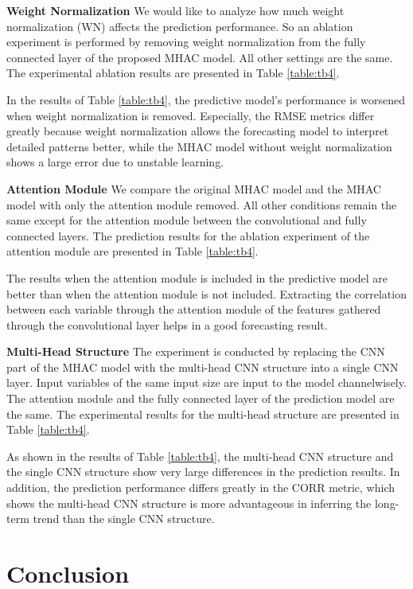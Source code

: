 \documentclass[conference]{IEEEtran}
\begin{document}
\noindent \textbf{Weight Normalization} We would like to analyze how much weight normalization (WN) affects the prediction performance. So an ablation experiment is performed by removing weight normalization from the fully connected layer of the proposed MHAC model. All other settings are the same. The experimental ablation results are presented in Table \ref{table:tb4}.

In the results of Table \ref{table:tb4}, the predictive model's performance is worsened when weight normalization is removed. Especially, the RMSE metrics differ greatly because weight normalization allows the forecasting model to interpret detailed patterns better, while the MHAC model without weight normalization shows a large error due to unstable learning.

\noindent \textbf{Attention Module} We compare the original MHAC model and the MHAC model with only the attention module removed. All other conditions remain the same except for the attention module between the convolutional and fully connected layers. The prediction results for the ablation experiment of the attention module are presented in Table \ref{table:tb4}.

The results when the attention module is included in the predictive model are better than when the attention module is not included. Extracting the correlation between each variable through the attention module of the features gathered through the convolutional layer helps in a good forecasting result.

\noindent \textbf{Multi-Head Structure} The experiment is conducted by replacing the CNN part of the MHAC model with the multi-head CNN structure into a single CNN layer. Input variables of the same input size are input to the model channelwisely. The attention module and the fully connected layer of the prediction model are the same. The experimental results for the multi-head structure are presented in Table \ref{table:tb4}. 

As shown in the results of Table \ref{table:tb4}, the multi-head CNN structure and the single CNN structure show very large differences in the prediction results. In addition, the prediction performance differs greatly in the CORR metric, which shows the multi-head CNN structure is more advantageous in inferring the long-term trend than the single CNN structure.

\section{Conclusion}
\end{document}
